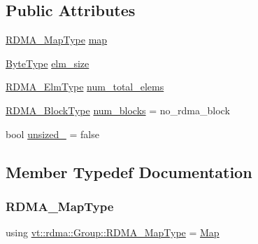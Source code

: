 \subsection*{Public Attributes}
\begin{DoxyCompactItemize}
\item 
\hyperlink{structvt_1_1rdma_1_1_group_a6a953be1b6d9907d49364a9a202d3379}{R\+D\+M\+A\+\_\+\+Map\+Type} \hyperlink{structvt_1_1rdma_1_1_group_ab2d2df3f8a32c3230210ab7ce74c0e4e}{map}
\item 
\hyperlink{namespacevt_aab8d55968084610ce3b17057981e9300}{Byte\+Type} \hyperlink{structvt_1_1rdma_1_1_group_a99d69c11abeba7369b05fd97fe339551}{elm\+\_\+size}
\item 
\hyperlink{namespacevt_a2c2a902092b72056f70210c159f966f0}{R\+D\+M\+A\+\_\+\+Elm\+Type} \hyperlink{structvt_1_1rdma_1_1_group_ad2de94667177ad994c5b5b7b697d09ac}{num\+\_\+total\+\_\+elems}
\item 
\hyperlink{namespacevt_ae54d2ca8f6bb4d65faf65118c82cd6f7}{R\+D\+M\+A\+\_\+\+Block\+Type} \hyperlink{structvt_1_1rdma_1_1_group_aa796cf358db135c28675c3843d839e4b}{num\+\_\+blocks} = no\+\_\+rdma\+\_\+block
\item 
bool \hyperlink{structvt_1_1rdma_1_1_group_a670e96730f19cc80e7b55a391d96f0b4}{unsized\+\_\+} = false
\end{DoxyCompactItemize}


\subsection{Member Typedef Documentation}
\mbox{\label{structvt_1_1rdma_1_1_group_a6a953be1b6d9907d49364a9a202d3379}} 
\subsubsection{\texorpdfstring{R\+D\+M\+A\+\_\+\+Map\+Type}{RDMA\_MapType}}
{\footnotesize\ttfamily using \hyperlink{structvt_1_1rdma_1_1_group_a6a953be1b6d9907d49364a9a202d3379}{vt\+::rdma\+::\+Group\+::\+R\+D\+M\+A\+\_\+\+Map\+Type} =  \hyperlink{structvt_1_1rdma_1_1_map}{Map}}

\mbox{\label{structvt_1_1rdma_1_1_group_a245644a7a0c40c547728a74e69c5e02f}} 
